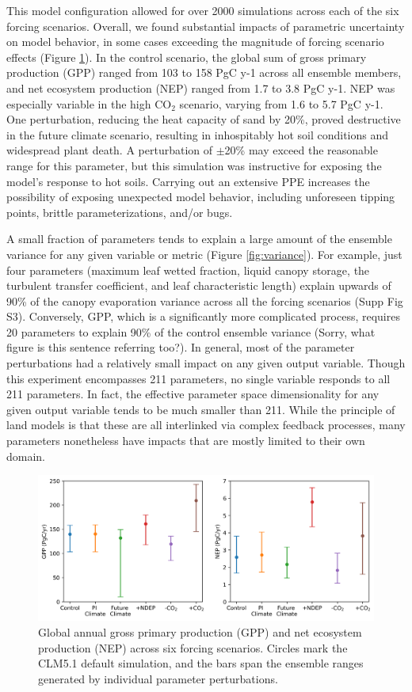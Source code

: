 \documentclass[draft]{agujournal2019}
\begin{document}
This model configuration allowed for over 2000 simulations across each of the six forcing scenarios.
Overall, we found substantial impacts of parametric uncertainty on model behavior, in some cases exceeding the magnitude of forcing scenario effects (Figure \ref{fig:ranges}). In the control scenario, the global sum of gross primary production (GPP) ranged from 103 to 158 PgC y-1 across all ensemble members, and net ecosystem production (NEP) ranged from 1.7 to 3.8 PgC y-1. NEP was especially variable in the high CO$_2$ scenario, varying from 1.6 to 5.7 PgC y-1. One perturbation, reducing the heat capacity of sand by 20\%, proved destructive in the future climate scenario, resulting in inhospitably hot soil conditions and widespread plant death. A perturbation of $\pm$20\% may exceed the reasonable range for this parameter, but this simulation was instructive for exposing the model's response to hot soils. Carrying out an extensive PPE increases the possibility of exposing unexpected model behavior, including unforeseen tipping points, brittle parameterizations, and/or bugs.

A small fraction of parameters tends to explain a large amount of the ensemble variance for any given variable or metric (Figure \ref{fig:variance}). For example, just four parameters (maximum leaf wetted fraction, liquid canopy storage, the turbulent transfer coefficient, and leaf characteristic length) explain upwards of 90\% of the canopy evaporation variance across all the forcing scenarios (Supp Fig S3). Conversely, GPP, which is a significantly more complicated process, requires 20 parameters to explain 90\% of the control ensemble variance (Sorry, what figure is this sentence referring too?). In general, most of the parameter perturbations had a relatively small impact on any given output variable. Though this experiment encompasses 211 parameters, no single variable responds to all 211 parameters. In fact, the effective parameter space dimensionality for any given output variable tends to be much smaller than 211. While the principle of land models is that these are all interlinked via complex feedback processes, many parameters nonetheless have impacts that are mostly limited to their own domain. 

\begin{figure}[h]
\centering
\includegraphics[width=\textwidth]{../figs/ranges.png}
\caption{Global annual gross primary production (GPP) and net ecosystem production (NEP) across six forcing scenarios. Circles mark the CLM5.1 default simulation, and the bars span the ensemble ranges generated by individual parameter perturbations.}
\label{fig:ranges}
\end{figure}
\end{document}
